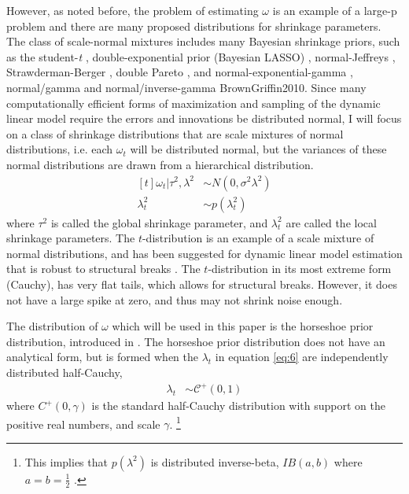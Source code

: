 \documentclass{article}
\newcommand{\paren}[1]{\ensuremath{\left(#1\right)}}
\newcommand{\dhalfcauchy}[1]{\ensuremath{\mathcal{C}^{+}\paren{#1}}}
\begin{document}
However, as noted before, the problem of estimating $\omega$ is an example of a large-p problem and there are many proposed distributions for shrinkage parameters.
The class of scale-normal mixtures includes many Bayesian shrinkage priors, such as the student-\textit{t} \parencite{Tipping2001}, double-exponential prior (Bayesian LASSO) \parencites{LiGoel2006}{ParkCasella2008}{Hans2009}, normal-Jeffreys \parencites{FigueiredoMember2003}{BaeMallick2004}, Strawderman-Berger \parencites{Strawderman1971}{Berger1980}, double Pareto \parencite{ArmaganDunsonLee2011},  and normal-exponential-gamma \parencite{BrownGriffin2005}, normal/gamma and normal/inverse-gamma \parencite{CaronDoucet2008}{BrownGriffin2010}.
Since many computationally efficient forms of maximization and sampling of the dynamic linear model require the errors and innovations be distributed normal, I will focus on a class of shrinkage distributions that are scale mixtures of normal distributions, i.e. each $\omega_{t}$ will be distributed normal, but the variances of these normal distributions are drawn from a hierarchical distribution.
\begin{equation}
  \label{eq:6}
  \begin{aligned}[t]
    \omega_{t} | \tau^{2}, \lambda^{2} & \sim N(0, \sigma^{2} \lambda^{2}) \\
    \lambda_{t}^{2} & \sim p(\lambda^{2}_{t})
  \end{aligned}
\end{equation}
where $\tau^{2}$ is called the global shrinkage parameter, and $\lambda_{t}^{2}$ are called the local shrinkage parameters.
The $t$-distribution is an example of a scale mixture of normal distributions, and has been suggested for dynamic linear model estimation that is robust to structural breaks \parencites{HarveyKoopman2000}{PetrisPetroneEtAl2009}.
The $t$-distribution in its most extreme form (Cauchy), has very flat tails, which allows for structural breaks.
However, it does not have a large spike at zero, and thus may not shrink noise enough.

The distribution of $\omega$ which will be used in this paper is the horseshoe prior distribution, introduced in \textcites{CarvalhoPolsonScott2009}{CarvalhoPolsonScott2010}.
The horseshoe prior distribution does not have an analytical form, but is formed when the $\lambda_{t}$ in equation \eqref{eq:6} are independently distributed half-Cauchy,
\begin{align}
  \label{eq:13}
  \lambda_{t} &\sim \dhalfcauchy{0, 1}
\end{align}
where $C^{+}(0, \gamma)$ is the standard half-Cauchy distribution with support on the positive real numbers, and scale $\gamma$.%
\footnote{
  This implies that $p(\lambda^{2})$ is distributed inverse-beta, $IB(a, b)$ where $a = b = \frac{1}{2}$ \parencite[4]{PolsonScott2010}. 
}
\end{document}

